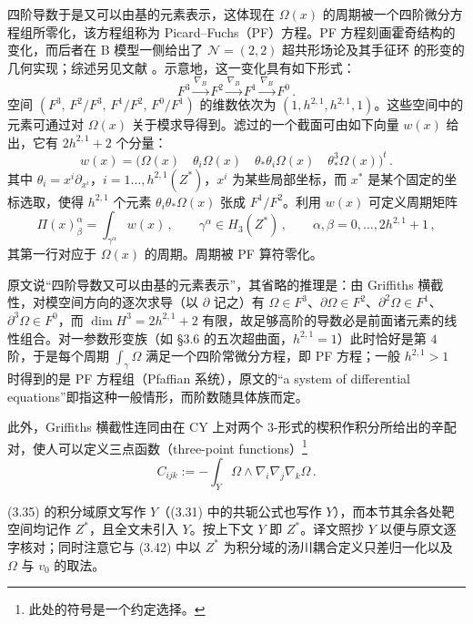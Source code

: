 四阶导数于是又可以由基的元素表示，这体现在 $\Omega(x)$ 的周期被一个四阶微分方程组所零化，该方程组称为 Picard--Fuchs（PF）方程。PF 方程刻画霍奇结构的变化，而后者在 B 模型一侧给出了 $\mathcal{N}=(2,2)$ 超共形场论及其手征环 \cite{ref50} 的形变的几何实现；综述另见文献 \cite{ref51}。示意地，这一变化具有如下形式：
\begin{equation}\tag{3.32}
F^3\xrightarrow{\nabla_B}F^2\xrightarrow{\nabla_B}F^1\xrightarrow{\nabla_B}F^0\,.
\end{equation}
空间 $(F^3,\,F^2/F^3,\,F^1/F^2,\,F^0/F^1)$ 的维数依次为 $(1,h^{2,1},h^{2,1},1)$。这些空间中的元素可通过对 $\Omega(x)$ 关于模求导得到。滤过的一个截面可由如下向量 $w(x)$ 给出，它有 $2h^{2,1}+2$ 个分量：
\begin{equation}\tag{3.33}
w(x)=\bigl(\Omega(x)\quad \theta_i\Omega(x)\quad \theta_*\theta_i\Omega(x)\quad \theta_*^3\Omega(x)\bigr)^t\,.
\end{equation}
其中 $\theta_i=x^i\partial_{x^i}$，$i=1\ldots,h^{2,1}(Z^*)$，$x^i$ 为某些局部坐标，而 $x^*$ 是某个固定的坐标选取，使得 $h^{2,1}$ 个元素 $\theta_i\theta_*\Omega(x)$ 张成 $F^1/F^2$。利用 $w(x)$ 可定义周期矩阵
\begin{equation}\tag{3.34}
\Pi(x)^{\alpha}_{\beta}=\int_{\gamma^\alpha}w(x)\,,\qquad
\gamma^\alpha\in H_3(Z^*)\,,\qquad
\alpha,\beta=0,\ldots,2h^{2,1}+1\,,
\end{equation}
其第一行对应于 $\Omega(x)$ 的周期。周期被 PF 算符零化。

\begin{yizhu}[含糊点]
原文说“四阶导数又可以由基的元素表示”，其省略的推理是：由 Griffiths 横截性，对模空间方向的逐次求导（以 $\partial$ 记之）有 $\Omega\in F^3$、$\partial\Omega\in F^2$、$\partial^2\Omega\in F^1$、$\partial^3\Omega\in F^0$，而 $\dim H^3=2h^{2,1}+2$ 有限，故足够高阶的导数必是前面诸元素的线性组合。对一参数形变族（如 §3.6 的五次超曲面，$h^{2,1}=1$）此时恰好是第 $4$ 阶，于是每个周期 $\int_\gamma\Omega$ 满足一个四阶常微分方程，即 PF 方程；一般 $h^{2,1}>1$ 时得到的是 PF 方程组（Pfaffian 系统），原文的“a system of differential equations”即指这种一般情形，而阶数随具体族而定。
\end{yizhu}

此外，Griffiths 横截性连同由在 CY 上对两个 3-形式的楔积作积分所给出的辛配对，使人可以定义三点函数（three-point functions）\footnote{此处的符号是一个约定选择。}
\begin{equation}\tag{3.35}
C_{ijk}:=-\int_Y\Omega\wedge\nabla_i\nabla_j\nabla_k\Omega\,.
\end{equation}
\begin{yizhu}[原文疑误]
(3.35) 的积分域原文写作 $Y$（(3.31) 中的共轭公式也写作 $Y$），而本节其余各处靶空间均记作 $Z^*$，且全文未引入 $Y$。按上下文 $Y$ 即 $Z^*$。译文照抄 $Y$ 以便与原文逐字核对；同时注意它与 (3.42) 中以 $Z^*$ 为积分域的汤川耦合定义只差归一化以及 $\Omega$ 与 $v_0$ 的取法。
\end{yizhu}

